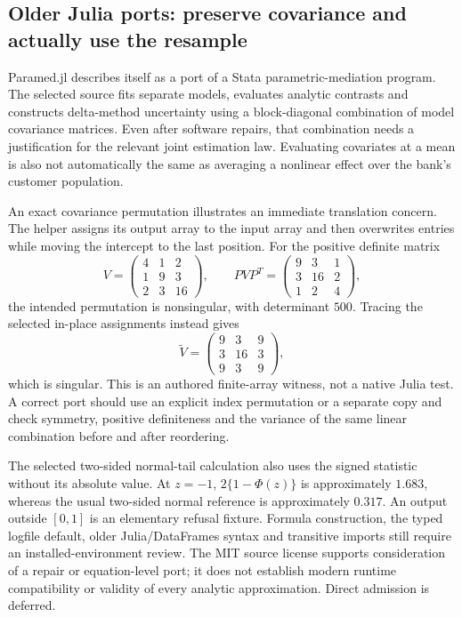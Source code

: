 \subsection{Older Julia ports: preserve covariance and actually use the resample}

Paramed.jl describes itself as a port of a Stata parametric-mediation program.
The selected source fits separate models, evaluates analytic contrasts and
constructs delta-method uncertainty using a block-diagonal combination of
model covariance matrices. Even after software repairs, that combination needs
a justification for the relevant joint estimation law. Evaluating covariates
at a mean is also not automatically the same as averaging a nonlinear effect
over the bank's customer population.\citep{exec25_omed_paramed}

An exact covariance permutation illustrates an immediate translation concern.
The helper assigns its output array to the input array and then overwrites
entries while moving the intercept to the last position. For the positive
definite matrix
\[
 V=\begin{pmatrix}4&1&2\\1&9&3\\2&3&16\end{pmatrix},\qquad
 PVP^T=\begin{pmatrix}9&3&1\\3&16&2\\1&2&4\end{pmatrix},
\]
the intended permutation is nonsingular, with determinant $500$. Tracing the
selected in-place assignments instead gives
\[
 \widetilde V=\begin{pmatrix}9&3&9\\3&16&3\\9&3&9\end{pmatrix},
\]
which is singular. This is an authored finite-array witness, not a native Julia
test. A correct port should use an explicit index permutation or a separate
copy and check symmetry, positive definiteness and the variance of the same
linear combination before and after reordering.\citep{exec25_omed_paramed,exec25_omed_choice}

The selected two-sided normal-tail calculation also uses the signed statistic
without its absolute value. At $z=-1$, $2\{1-\Phi(z)\}$ is approximately
$1.683$, whereas the usual two-sided normal reference is approximately $0.317$.
An output outside $[0,1]$ is an elementary refusal fixture. Formula construction,
the typed logfile default, older Julia/DataFrames syntax and transitive imports
still require an installed-environment review. The MIT source license supports
consideration of a repair or equation-level port; it does not establish modern
runtime compatibility or validity of every analytic approximation. Direct
admission is deferred.\citep{exec25_omed_paramed,exec25_omed_choice}

